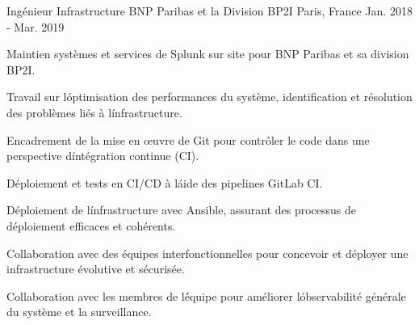 \begin{cventries}
  \cventry
    {Ingénieur Infrastructure} %
    {BNP Paribas et la Division BP2I} %
    {Paris, France} %
    {Jan. 2018 - Mar. 2019} %
    {
      \begin{cvitems} %
        \item {Maintien systèmes et services de Splunk sur site pour BNP Paribas et sa division BP2I.}
        \item {Travail sur l\' optimisation des performances du système, identification et résolution des problèmes liés à l\' infrastructure.}
        \item {Encadrement de la mise en œuvre de Git pour contrôler le code dans une perspective d\' intégration continue (CI).}
        \item {Déploiement et tests en CI/CD à l\' aide des pipelines GitLab CI.}
        \item {Déploiement de l\' infrastructure avec Ansible, assurant des processus de déploiement efficaces et cohérents.}
        \item {Collaboration avec des équipes interfonctionnelles pour concevoir et déployer une infrastructure évolutive et sécurisée.}
        \item {Collaboration avec les membres de l\' équipe pour améliorer l\' observabilité générale du système et la surveillance.}
      \end{cvitems}
    }


\end{cventries}

